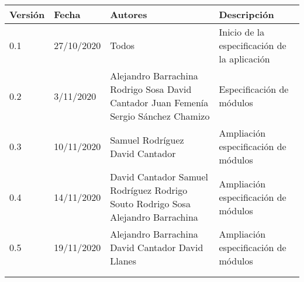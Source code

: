 \documentclass[12pt]{article}
\begin{document}
\noindent\begin{tabularx}{\textwidth}{ |l|l|p{5cm}|X| }
    \hline
    \textbf{Versión} & \textbf{Fecha} & \textbf{Autores}                                                                                                         & \textbf{Descripción}                         \\
    \hline
    0.1              & 27/10/2020     & Todos                                                                                                                    & Inicio de la especificación de la aplicación \\
    \hline
    0.2              & 3/11/2020      & Alejandro Barrachina \newline Rodrigo Sosa \newline David Cantador \newline Juan Femenía \newline Sergio Sánchez Chamizo & Especificación de módulos                    \\
    \hline
    0.3              & 10/11/2020     & Samuel Rodríguez \newline David Cantador                                                                                 & Ampliación especificación de módulos         \\
    \hline
    0.4              & 14/11/2020     & David Cantador \newline Samuel Rodríguez \newline Rodrigo Souto \newline Rodrigo Sosa \newline Alejandro Barrachina      & Ampliación especificación de módulos         \\
    \hline
    0.5              & 19/11/2020     & Alejandro Barrachina \newline David Cantador \newline David Llanes                                                       & Ampliación especificación de módulos         \\
    \hline
                     &                &                                                                                                                          &                                              \\
    \hline
                     &                &                                                                                                                          &                                              \\

\end{tabularx}
\end{document}
